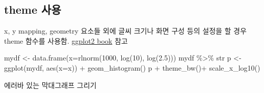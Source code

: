 \documentclass[
]{book}
\newenvironment{Shaded}{\begin{snugshade}}{\end{snugshade}}
\newcommand{\AttributeTok}[1]{\textcolor[rgb]{0.77,0.63,0.00}{#1}}
\newcommand{\DecValTok}[1]{\textcolor[rgb]{0.00,0.00,0.81}{#1}}
\newcommand{\FloatTok}[1]{\textcolor[rgb]{0.00,0.00,0.81}{#1}}
\newcommand{\FunctionTok}[1]{\textcolor[rgb]{0.00,0.00,0.00}{#1}}
\newcommand{\NormalTok}[1]{#1}
\newcommand{\OtherTok}[1]{\textcolor[rgb]{0.56,0.35,0.01}{#1}}
\newcommand{\SpecialCharTok}[1]{\textcolor[rgb]{0.00,0.00,0.00}{#1}}
\begin{document}
\hypertarget{day2_class2_theme}{%
\subsection{theme 사용}\label{day2_class2_theme}}

x, y mapping, geometry 요소들 외에 글씨 크기나 화면 구성 등의 설정을 할 경우 theme 함수를 사용함. \href{https://ggplot2-book.org/polishing.html}{ggplot2 book} 참고

\begin{Shaded}
\begin{Highlighting}[]
\NormalTok{mydf }\OtherTok{\textless{}{-}} \FunctionTok{data.frame}\NormalTok{(}\AttributeTok{x=}\FunctionTok{rlnorm}\NormalTok{(}\DecValTok{1000}\NormalTok{, }\FunctionTok{log}\NormalTok{(}\DecValTok{10}\NormalTok{), }\FunctionTok{log}\NormalTok{(}\FloatTok{2.5}\NormalTok{)))}
\NormalTok{mydf }\SpecialCharTok{\%\textgreater{}\%}\NormalTok{ str}
\NormalTok{p }\OtherTok{\textless{}{-}} \FunctionTok{ggplot}\NormalTok{(mydf, }\FunctionTok{aes}\NormalTok{(}\AttributeTok{x=}\NormalTok{x)) }\SpecialCharTok{+}
  \FunctionTok{geom\_histogram}\NormalTok{()}
\NormalTok{p }\SpecialCharTok{+} 
  \FunctionTok{theme\_bw}\NormalTok{()}\SpecialCharTok{+}
  \FunctionTok{scale\_x\_log10}\NormalTok{()}
\end{Highlighting}
\end{Shaded}

에러바 있는 막대그래프 그리기
\end{document}
